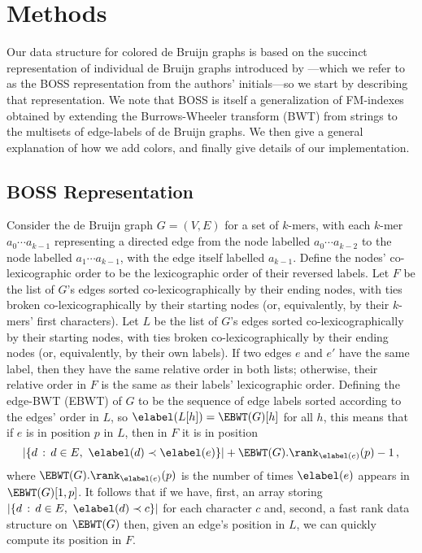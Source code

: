 \section{Methods}
\label{sec:methods}

Our data structure for colored de Bruijn graphs is based on the succinct representation of individual de Bruijn graphs introduced by \cite{BOSS12}---which we refer to as the BOSS representation from the authors' initials---so we start by describing that representation.  We note that BOSS is itself a generalization of FM-indexes~\citep{FM05} obtained by extending the Burrows-Wheeler transform (BWT) from strings to the multisets of edge-labels of de Bruijn graphs.  We then give a general explanation of how we add colors, and finally give details of our implementation.

\subsection{BOSS Representation}
\label{subsec:boss}

Consider the de Bruijn graph \(G = (V, E)\) for a set of $k$-mers, with each $k$-mer \(a_0 \cdots a_{k - 1}\) representing a directed edge from the node labelled \(a_0 \cdots a_{k - 2}\) to the node labelled \(a_1 \cdots a_{k - 1}\), with the edge itself labelled \(a_{k - 1}\).  Define the nodes' co-lexicographic order to be the lexicographic order of their reversed labels.  Let $F$ be the list of $G$'s edges sorted co-lexicographically by their ending nodes, with ties broken co-lexicographically by their starting nodes (or, equivalently, by their $k$-mers' first characters).  Let $L$ be the list of $G$'s edges sorted co-lexicographically by their starting nodes, with ties broken co-lexicographically by their ending nodes (or, equivalently, by their own labels).  If two edges $e$ and $e'$ have the same label, then they have the same relative order in both lists; otherwise, their relative order in $F$ is the same as their labels' lexicographic order.  Defining the edge-BWT (EBWT) of $G$ to be the sequence of edge labels sorted according to the edges' order in $L$, so \(\elabel (L [h]) = \EBWT (G) [h]\) for all $h$, this means that if $e$ is in position $p$ in $L$, then in $F$ it is in position
\begin{equation*}
|\{d\,:\,d \in E,\ \elabel (d) \prec \elabel (e)\}| + \EBWT (G).\rank_{\elabel (e)} (p) - 1\,,
\end{equation*}
where \(\EBWT (G).\rank_{\elabel (e)} (p)\) is the number of times $\elabel (e)$ appears in \(\EBWT (G) [1,p]\).  It follows that if we have, first, an array storing \(|\{d\,:\,d \in E,\ \elabel (d) \prec c\}|\) for each character $c$ and, second, a fast rank data structure on \(\EBWT (G)\) then, given an edge's position in $L$, we can quickly compute its position in $F$.

